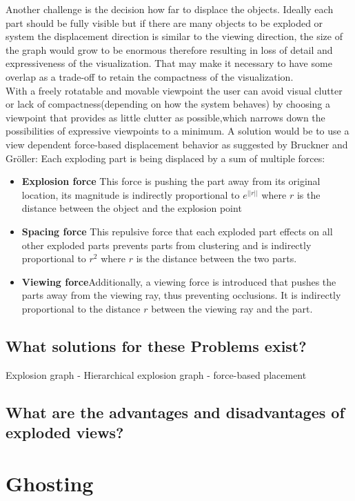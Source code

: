 Another challenge is the decision how far to displace the objects. Ideally each part should be fully visible but if there are many objects to be exploded or system the displacement direction is similar to the viewing direction, the size of the graph would grow to be enormous therefore resulting in loss of detail and expressiveness of the visualization. That may make it necessary to have some overlap as a trade-off to retain the compactness of the visualization.\\
With a freely rotatable and movable viewpoint the user can avoid visual clutter or lack of compactness(depending on how the system behaves) by choosing a viewpoint that provides as little clutter as possible,which narrows down the possibilities of expressive viewpoints to a minimum. A solution would be to use a view dependent force-based displacement behavior as suggested by Bruckner and Gr\"oller\cite{proc:bruckner-2006-EVV}: Each exploding part is being displaced by a sum of multiple forces:
\begin{itemize}
\item \textbf{Explosion force} This force is pushing the part away from its original location, its magnitude is indirectly proportional to $e^{||r||}$ where $r$ is the distance between the object and the explosion point
\item \textbf{Spacing force} This repulsive force that each exploded part effects on all other exploded parts prevents parts from clustering and is indirectly proportional to $r^2$ where $r$ is the distance between the two parts.
\item \textbf{Viewing force}Additionally,  a viewing force is introduced that pushes the parts away from the viewing ray, thus preventing occlusions. It is indirectly proportional to the distance $r$ between the viewing ray and the part.
\end{itemize}


\subsection{What solutions for these Problems exist?}
Explosion graph - Hierarchical explosion graph - force-based placement
\subsection{What are the advantages and disadvantages of exploded views?}

\section{Ghosting}
